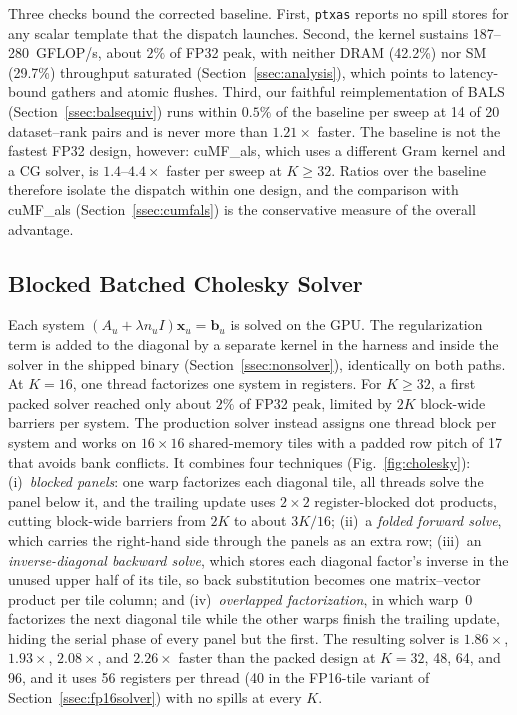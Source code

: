 Three checks bound the corrected baseline. First, \texttt{ptxas} reports no spill stores for any scalar template that the dispatch launches. Second, the kernel sustains 187--280~GFLOP/s, about $2\%$ of FP32 peak, with neither DRAM (42.2\%) nor SM (29.7\%) throughput saturated (Section~\ref{ssec:analysis}), which points to latency-bound gathers and atomic flushes. Third, our faithful reimplementation of BALS (Section~\ref{ssec:balsequiv}) runs within $0.5\%$ of the baseline per sweep at 14 of 20 dataset--rank pairs and is never more than $1.21\times$ faster. The baseline is not the fastest FP32 design, however: cuMF\_als, which uses a different Gram kernel and a CG solver, is $1.4$--$4.4\times$ faster per sweep at $K \ge 32$. Ratios over the baseline therefore isolate the dispatch within one design, and the comparison with cuMF\_als (Section~\ref{ssec:cumfals}) is the conservative measure of the overall advantage.

\subsection{Blocked Batched Cholesky Solver}
\label{ssec:cholesky}

Each system $(A_u + \lambda n_u I)\mathbf{x}_u = \mathbf{b}_u$ is solved on the GPU. The regularization term is added to the diagonal by a separate kernel in the harness and inside the solver in the shipped binary (Section~\ref{ssec:nonsolver}), identically on both paths. At $K=16$, one thread factorizes one system in registers. For $K \ge 32$, a first packed solver reached only about $2\%$ of FP32 peak, limited by $2K$ block-wide barriers per system. The production solver instead assigns one thread block per system and works on $16 \times 16$ shared-memory tiles with a padded row pitch of 17 that avoids bank conflicts. It combines four techniques (Fig.~\ref{fig:cholesky}):
(i)~\textit{blocked panels}: one warp factorizes each diagonal tile, all threads solve the panel below it, and the trailing update uses $2 \times 2$ register-blocked dot products, cutting block-wide barriers from $2K$ to about $3K/16$; (ii)~a \textit{folded forward solve}, which carries the right-hand side through the panels as an extra row; (iii)~an \textit{inverse-diagonal backward solve}, which stores each diagonal factor's inverse in the unused upper half of its tile, so back substitution becomes one matrix--vector product per tile column; and (iv)~\textit{overlapped factorization}, in which warp~0 factorizes the next diagonal tile while the other warps finish the trailing update, hiding the serial phase of every panel but the first.
The resulting solver is $1.86\times$, $1.93\times$, $2.08\times$, and $2.26\times$ faster than the packed design at $K = 32$, 48, 64, and 96, and it uses 56 registers per thread (40 in the FP16-tile variant of Section~\ref{ssec:fp16solver}) with no spills at every $K$.

